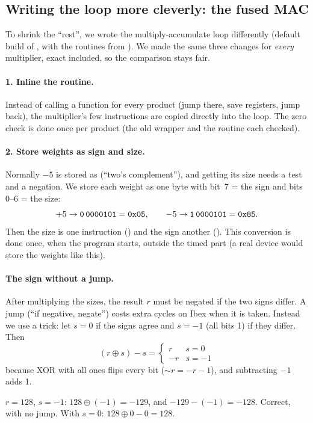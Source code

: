 \subsection{Writing the loop more cleverly: the fused MAC}\label{sec:fused}

To shrink the ``rest'', we wrote the multiply-accumulate loop differently (default build of
, with the routines from ). We made the same three changes for
\emph{every} multiplier, exact included, so the comparison stays fair.

\paragraph{1. Inline the routine.} Instead of calling a function for every product (jump there, save
registers, jump back), the multiplier's few instructions are copied directly into the loop. The zero check
is done once per product (the old wrapper and the routine each checked).

\paragraph{2. Store weights as sign and size.} Normally $-5$ is stored as  (``two's
complement''), and getting its size needs a test and a negation. We store each weight as one byte with
bit~7 = the sign and bits 0--6 = the size:
\[
  +5 \to \texttt{0\,0000101} = \texttt{0x05},\qquad -5 \to \texttt{1\,0000101} = \texttt{0x85}.
\]
Then the size is one instruction () and the sign another (). This
conversion is done once, when the program starts, outside the timed part (a real device would store the
weights like this).

\paragraph{The sign without a jump.} After multiplying the sizes, the result $r$ must be negated if the two
signs differ. A jump (``if negative, negate'') costs extra cycles on Ibex when it is taken. Instead we use a
trick: let $s = 0$ if the signs agree and $s = -1$ (all bits 1) if they differ. Then
\[
  (r \oplus s) - s = \begin{cases} r & s = 0\\ -r & s = -1\end{cases}
\]
because XOR with all ones flips every bit ($\sim r = -r-1$), and subtracting $-1$ adds 1.
\begin{example}
$r = 128$, $s = -1$: $128 \oplus (-1) = -129$, and $-129 - (-1) = -128$. Correct, with no jump.
With $s=0$: $128\oplus 0 - 0 = 128$.
\end{example}

